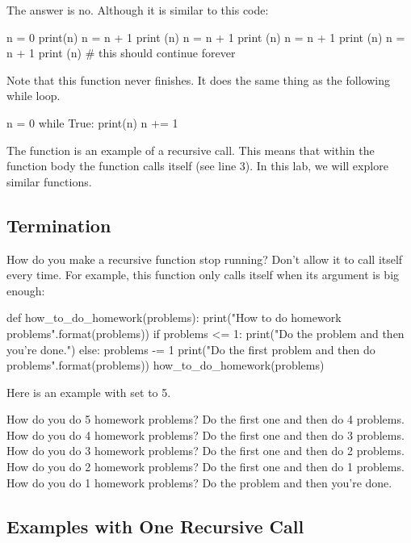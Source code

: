 \documentclass[11pt]{cselabheader}
\begin{document}
The answer is no. Although it is similar to this code:

\begin{python3code}
n = 0
print(n)
n = n + 1
print (n)
n = n + 1
print (n)
n = n + 1
print (n)
n = n + 1
print (n)
# this should continue forever
\end{python3code}

Note that this function never finishes.
It does the same thing as the following while loop.

\begin{python3code}
n = 0
while True:
    print(n)
    n += 1
\end{python3code}

The  function is an example of a recursive call.
This means that within the function body the function calls itself
(see line 3). In this lab, we will explore similar functions.

\subsection{Termination}

How do you make a recursive function stop running?  Don't allow it to
call itself every time. For example, this function only calls itself
when its argument is big enough:

\begin{python3code}
def how_to_do_homework(problems):
    print("How to do {} homework problems".format(problems))
    if problems <= 1:
        print("Do the problem and then you're done.")
    else:
        problems -= 1
        print("Do the first problem and then do {} problems".format(problems))
        how_to_do_homework(problems)
\end{python3code}

Here is an example with  set to 5.

\begin{verbatimcode}
How do you do 5 homework problems?
Do the first one and then do 4 problems.
How do you do 4 homework problems?
Do the first one and then do 3 problems.
How do you do 3 homework problems?
Do the first one and then do 2 problems.
How do you do 2 homework problems?
Do the first one and then do 1 problems.
How do you do 1 homework problems?
Do the problem and then you're done.
\end{verbatimcode}

\subsection{Examples with One Recursive Call}
\end{document}
